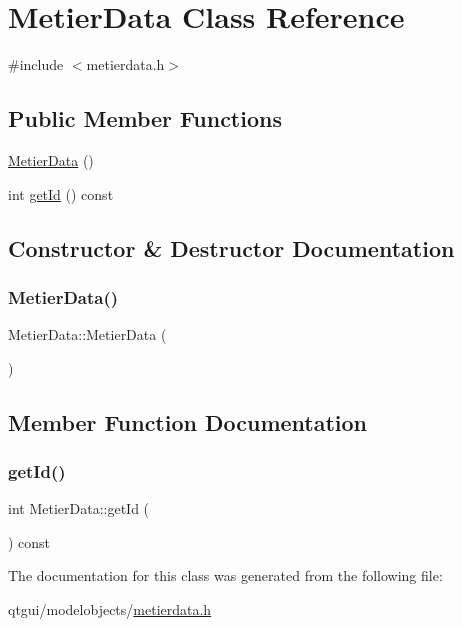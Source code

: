 \hypertarget{class_metier_data}{}\section{Metier\+Data Class Reference}
\label{class_metier_data}


{\ttfamily \#include $<$metierdata.\+h$>$}

\subsection*{Public Member Functions}
\begin{DoxyCompactItemize}
\item 
\mbox{\hyperlink{class_metier_data_a953af9145edf6b39343cd41800945604}{Metier\+Data}} ()
\item 
int \mbox{\hyperlink{class_metier_data_ac34976a213c69a8783df80f75be587ea}{get\+Id}} () const
\end{DoxyCompactItemize}


\subsection{Constructor \& Destructor Documentation}
\mbox{\label{class_metier_data_a953af9145edf6b39343cd41800945604}} 
\subsubsection{\texorpdfstring{MetierData()}{MetierData()}}
{\footnotesize\ttfamily Metier\+Data\+::\+Metier\+Data (\begin{DoxyParamCaption}{ }\end{DoxyParamCaption})\hspace{0.3cm}{\ttfamily [inline]}}



\subsection{Member Function Documentation}
\mbox{\label{class_metier_data_ac34976a213c69a8783df80f75be587ea}} 
\subsubsection{\texorpdfstring{getId()}{getId()}}
{\footnotesize\ttfamily int Metier\+Data\+::get\+Id (\begin{DoxyParamCaption}{ }\end{DoxyParamCaption}) const\hspace{0.3cm}{\ttfamily [inline]}}



The documentation for this class was generated from the following file\+:\begin{DoxyCompactItemize}
\item 
qtgui/modelobjects/\mbox{\hyperlink{metierdata_8h}{metierdata.\+h}}\end{DoxyCompactItemize}
